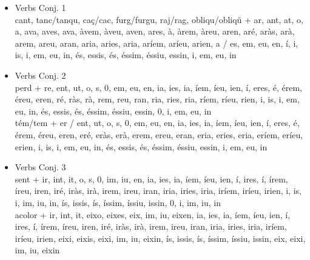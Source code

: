 \begin{flushleft}
\begin{itemize}
\item  Verbs Conj. 1\\
cant, tanc/tanqu, caç/cac, furg/furgu, raj/rag, obliqu/obliqü + ar, ant, at, o, a, ava, aves, ava, àvem, àveu, aven, ares, à, àrem, àreu, aren, aré, aràs, arà, arem, areu, aran, aria, aries, aria, aríem, aríeu, arien, a / es, em, eu, en, í, i, is, i, em, eu, in, és, essis, és, éssim, éssiu, essin, i, em, eu, in\\

\item  Verbs Conj. 2\\
perd + re, ent, ut, o, s, 0, em, eu, en, ia, ies, ia, íem, íeu, ien, í, eres, é, érem, éreu, eren, ré, ràs, rà, rem, reu, ran, ria, ries, ria, ríem, ríeu, rien, i, is, i, em, eu, in, és, essis, és, éssim, éssiu, essin, 0, i, em, eu, in\\
tém/tem + er / ent, ut, o, s, 0, em, eu, en, ia, ies, ia, íem, íeu, ien, í, eres, é, érem, éreu, eren, eré, eràs, erà, erem, ereu, eran, eria, eries, eria, eríem, eríeu, erien, i, is, i, em, eu, in, és, essis, és, éssim, éssiu, essin, i, em, eu, in\\

\item  Verbs Conj. 3\\
sent + ir, int, it, o, s, 0, im, iu, en, ia, ies, ia, íem, íeu, ien, í, ires, í, írem, íreu, iren, iré, iràs, irà, irem, ireu, iran, iria, iries, iria, iríem, iríeu, irien, i, is, i, im, iu, in, ís, issis, ís, íssim, íssiu, issin, 0, i, im, iu, in\\

acolor + ir, int, it, eixo, eixes, eix, im, iu, eixen, ia, ies, ia, íem, íeu, ien, í, ires, í, írem, íreu, iren, iré, iràs, irà, irem, ireu, iran, iria, iries, iria, iríem, iríeu, irien, eixi, eixis, eixi, im, iu, eixin, ís, issis, ís, íssim, íssiu, issin, eix, eixi, im, iu, eixin\\

\end{itemize}
\end{flushleft}